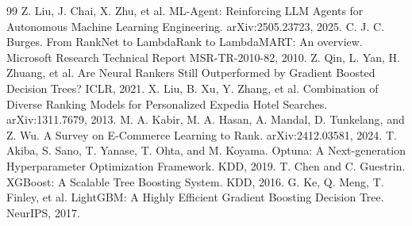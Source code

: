 \documentclass[]{ceurart}
\begin{document}
\begin{thebibliography}{99}
 Z. Liu, J. Chai, X. Zhu, et al. ML-Agent: Reinforcing LLM
Agents for Autonomous Machine Learning Engineering. arXiv:2505.23723, 2025.
 C. J. C. Burges. From RankNet to LambdaRank to
LambdaMART: An overview. Microsoft Research Technical Report MSR-TR-2010-82,
2010.
 Z. Qin, L. Yan, H. Zhuang, et al. Are Neural Rankers
Still Outperformed by Gradient Boosted Decision Trees? ICLR, 2021.
 X. Liu, B. Xu, Y. Zhang, et al. Combination of Diverse
Ranking Models for Personalized Expedia Hotel Searches. arXiv:1311.7679,
2013.
 M. A. Kabir, M. A. Hasan, A. Mandal, D. Tunkelang, and
Z. Wu. A Survey on E-Commerce Learning to Rank. arXiv:2412.03581, 2024.
 T. Akiba, S. Sano, T. Yanase, T. Ohta, and M. Koyama.
Optuna: A Next-generation Hyperparameter Optimization Framework. KDD, 2019.
 T. Chen and C. Guestrin. XGBoost: A Scalable Tree Boosting
System. KDD, 2016.
 G. Ke, Q. Meng, T. Finley, et al. LightGBM: A Highly
Efficient Gradient Boosting Decision Tree. NeurIPS, 2017.
\end{thebibliography}
\end{document}

